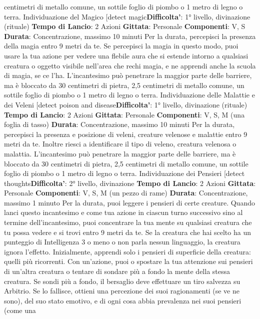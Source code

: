 \begin{multicols}{2}
centimetri di metallo comune, un sottile foglio di piombo
o 1 metro di legno o terra.
Individuazione del Magico
[detect magic\textbf{Difficolta'}:
1° livello, divinazione (rituale)
\textbf{Tempo di Lancio}: 2 Azioni
\textbf{Gittata}: Personale
\textbf{Componenti}: V, S
\textbf{Durata}: Concentrazione, massimo 10 minuti
Per la durata, percepisci la presenza della magia entro
9 metri da te. Se percepisci la magia in questo modo,
puoi usare la tua azione per vedere una flebile aura che 
si estende intorno a qualsiasi creatura o oggetto visibile
nell’area che rechi magia, e ne apprendi anche la
scuola di magia, se ce l’ha.
L’incantesimo può penetrare la maggior parte delle
barriere, ma è bloccato da 30 centimetri di pietra, 2,5
centimetri di metallo comune, un sottile foglio di piombo
o 1 metro di legno o terra.
Individuazione delle Malattie e dei Veleni
[detect poison and disease\textbf{Difficolta'}:
1° livello, divinazione (rituale)
\textbf{Tempo di Lancio}: 2 Azioni
\textbf{Gittata}: Personale
\textbf{Componenti}: V, S, M (una foglia di tasso)
\textbf{Durata}: Concentrazione, massimo 10 minuti
Per la durata, percepisci la presenza e posizione di
veleni, creature velenose e malattie entro 9 metri da te.
Inoltre riesci a identificare il tipo di veleno, creatura
velenosa o malattia.
L’incantesimo può penetrare la maggior parte delle
barriere, ma è bloccato da 30 centimetri di pietra, 2,5
centimetri di metallo comune, un sottile foglio di piombo
o 1 metro di legno o terra.
Individuazione dei Pensieri
[detect thoughts\textbf{Difficolta'}:
2° livello, divinazione
\textbf{Tempo di Lancio}: 2 Azioni
\textbf{Gittata}: Personale
\textbf{Componenti}: V, S, M (un pezzo di rame)
\textbf{Durata}: Concentrazione, massimo 1 minuto
Per la durata, puoi leggere i pensieri di certe creature.
Quando lanci questo incantesimo e come tua azione in
ciascun turno successivo sino al termine
dell’incantesimo, puoi concentrare la tua mente su
qualsiasi creatura che tu possa vedere e si trovi entro 9
metri da te. Se la creatura che hai scelto ha un
punteggio di Intelligenza 3 o meno o non parla nessun
linguaggio, la creatura ignora l’effetto.
Inizialmente, apprendi solo i pensieri di superficie della
creatura: quelli più ricorrenti. Con un’azione, puoi o
spostare la tua attenzione sui pensieri di un’altra
creatura o tentare di sondare più a fondo la mente della
stessa creatura. Se sondi più a fondo, il bersaglio deve
effettuare un tiro salvezza su Arbitrio. Se lo fallisce,
ottieni una percezione dei suoi ragionamenti (se ve ne
sono), del suo stato emotivo, e di ogni cosa abbia
prevalenza nei suoi pensieri (come una

\end{multicols}
